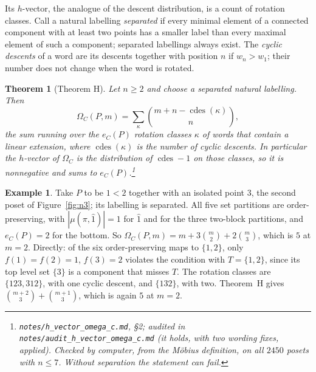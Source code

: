 \documentclass[11pt]{article}
\newtheorem{theorem}{Theorem}
\theoremstyle{definition}
\newtheorem{example}{Example}
\theoremstyle{remark}
\newcommand{\src}[1]{\nolinkurl{#1}}
\newcommand{\tagbox}[1]{\leavevmode\marginpar{\raggedright\fbox{\parbox{0.66in}{\centering\scriptsize\sffamily #1}}}}
\newcommand{\PROVEN}{\tagbox{PROVEN\\AUDITED}}
\begin{document}
Its $h$-vector, the analogue of the descent distribution, is a count of
rotation classes. Call a natural labelling \emph{separated} if every
minimal element of a connected component with at least two points has a
smaller label than every maximal element of such a component; separated
labellings always exist. The \emph{cyclic descents} of a word are its
descents together with position $n$ if $w_n>w_1$; their number does not
change when the word is rotated.

\begin{theorem}[Theorem H]\label{thm:H}\PROVEN
Let $n\ge2$ and choose a separated natural labelling. Then
\[
\Omega_C(P,m)=\sum_{\kappa}\binom{m+n-\operatorname{cdes}(\kappa)}{n},
\]
the sum running over the $e_C(P)$ rotation classes $\kappa$ of words that
contain a linear extension, where $\operatorname{cdes}(\kappa)$ is the
number of cyclic descents. In particular the $h$-vector of $\Omega_C$ is
the distribution of $\operatorname{cdes}-1$ on those classes, so it is
nonnegative and sums to $e_C(P)$.\footnote{\src{notes/h_vector_omega_c.md},
\S2; audited in \src{notes/audit_h_vector_omega_c.md} (it holds, with two
wording fixes, applied). Checked by computer, from the M\"obius
definition, on all $2450$ posets with $n\le7$. Without separation the
statement can fail.}
\end{theorem}

\begin{example}
Take $P$ to be $1<2$ together with an isolated point $3$, the second poset
of Figure~\ref{fig:n3}; its labelling is separated. All five set
partitions are order-preserving, with $|\mu(\pi,\hat1)|=1$ for $\hat1$ and
for the three two-block partitions, and $e_C(P)=2$ for the bottom. So
$\Omega_C(P,m)=m+3\binom m2+2\binom m3$, which is $5$ at $m=2$. Directly:
of the six order-preserving maps to $\{1,2\}$, only $f(1)=f(2)=1$, $f(3)=2$
violates the condition with $T=\{1,2\}$, since its top level set $\{3\}$ is
a component that misses $T$. The rotation classes are $\{123,312\}$, with
one cyclic descent, and $\{132\}$, with two. Theorem~H gives
$\binom{m+2}3+\binom{m+1}3$, which is again $5$ at $m=2$.
\end{example}
\end{document}
